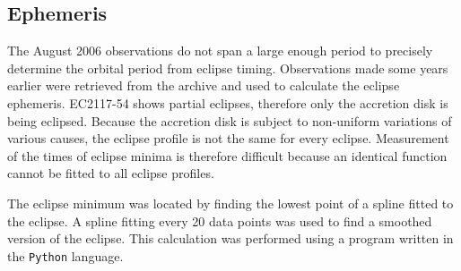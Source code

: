 
\subsection{Ephemeris}

\label{ephemeris_section}

The August 2006 observations do not span a large enough period to precisely determine the orbital period from eclipse timing. Observations made some years earlier \citep{WWP} were retrieved from the archive and used to calculate the eclipse ephemeris. EC2117-54 shows partial eclipses, therefore only the accretion disk is being eclipsed. Because the accretion disk is subject to non-uniform variations of various causes, the eclipse profile is not the same for every eclipse. Measurement of the times of eclipse minima is therefore difficult because an identical function cannot be fitted to all eclipse profiles.

The eclipse minimum was located by finding the lowest point of a spline fitted to the eclipse. A spline fitting every 20 data points was used to find a smoothed version of the eclipse. This calculation was performed using a program written in the \texttt{Python} language.






